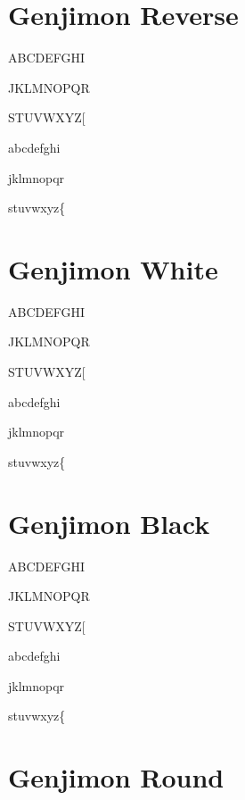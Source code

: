 \documentclass[12pt]{article}
\begin{document}
\clearpage


\section{Genjimon Reverse}

{
ABCDEFGHI

JKLMNOPQR

STUVWXYZ[

abcdefghi

jklmnopqr

stuvwxyz\{}

\clearpage


\section{Genjimon White}

{
ABCDEFGHI

JKLMNOPQR

STUVWXYZ[

abcdefghi

jklmnopqr

stuvwxyz\{}

\clearpage


\section{Genjimon Black}

{
ABCDEFGHI

JKLMNOPQR

STUVWXYZ[

abcdefghi

jklmnopqr

stuvwxyz\{}

\clearpage


\section{Genjimon Round}
\end{document}
